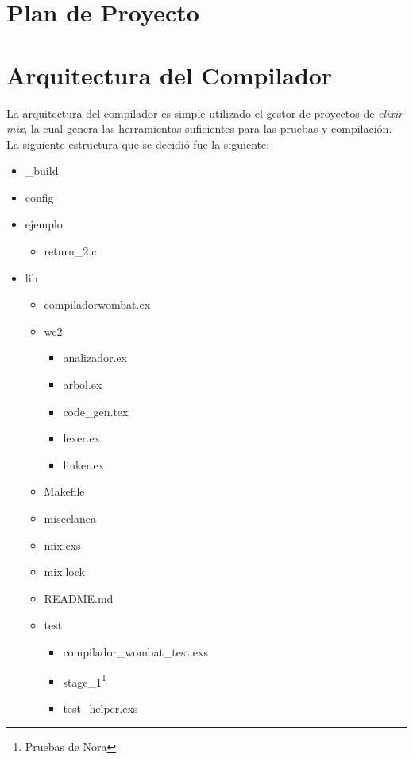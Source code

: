 \documentclass{article}
\begin{document}
\section{Plan de Proyecto}

\section{Arquitectura del Compilador}

La arquitectura del compilador es simple utilizado el gestor de proyectos de \textit{elixir}
\textit{mix}, la cual genera las herramientas suficientes para las pruebas y compilación. La
siguiente estructura que se decidió fue la siguiente:

\begin{itemize}
\item \_build
\item config
\item ejemplo
  \begin{itemize}
  \item return\_2.c
  \end{itemize}
\item lib
  \begin{itemize}
  \item compiladorwombat.ex
  \item wc2
    \begin{itemize}
    \item analizador.ex
    \item arbol.ex
    \item code\_gen.tex
    \item lexer.ex
    \item linker.ex
    \end{itemize}
  \item Makefile
  \item miscelanea
  \item mix.exs
  \item mix.lock
  \item README.md
  \item test
    \begin{itemize}
    \item compilador\_wombat\_test.exs
    \item stage\_1\footnote{Pruebas de Nora}
    \item test\_helper.exs
    \end{itemize}

  \end{itemize}

\end{itemize}
\end{document}
